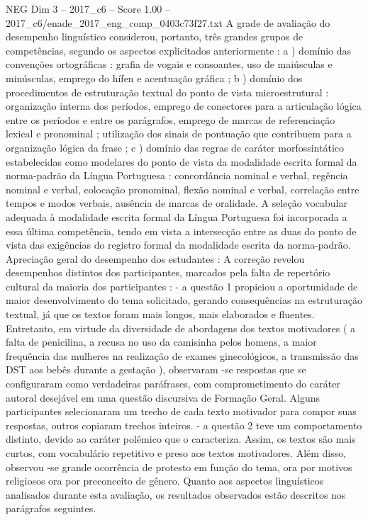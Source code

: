 \begin{textsample}{NEG Dim 3 – 2017\_c6 – Score 1.00 – 2017\_c6/enade\_2017\_eng\_comp\_0403c73f27.txt}
A grade de avaliação do desempenho linguístico considerou, portanto, três grandes grupos de competências, segundo os aspectos explicitados anteriormente : a ) domínio das convenções ortográficas : grafia de vogais e consoantes, uso de maiúsculas e minúsculas, emprego do hífen e acentuação gráfica ; b ) domínio dos procedimentos de estruturação textual do ponto de vista microestrutural : organização interna dos períodos, emprego de conectores para a articulação lógica entre os períodos e entre os parágrafos, emprego de marcas de referenciação lexical e pronominal ; utilização dos sinais de pontuação que contribuem para a organização lógica da frase ; c ) domínio das regras de caráter morfossintático estabelecidas como modelares do ponto de vista da modalidade escrita formal da norma-padrão da Língua Portuguesa : concordância nominal e verbal, regência nominal e verbal, colocação pronominal, flexão nominal e verbal, correlação entre tempos e modos verbais, ausência de marcas de oralidade.
A seleção vocabular adequada à modalidade escrita formal da Língua Portuguesa foi incorporada a essa última competência, tendo em vista a intersecção entre as duas do ponto de vista das exigências do registro formal da modalidade escrita da norma-padrão.
Apreciação geral do desempenho dos estudantes : A correção revelou desempenhos distintos dos participantes, marcados pela falta de repertório cultural da maioria dos participantes : - a questão 1 propiciou a oportunidade de maior desenvolvimento do tema solicitado, gerando consequências na estruturação textual, já que os textos foram mais longos, mais elaborados e fluentes.
Entretanto, em virtude da diversidade de abordagens dos textos motivadores ( a falta de penicilina, a recusa no uso da camisinha pelos homens, a maior frequência das mulheres na realização de exames ginecológicos, a transmissão das DST aos bebês durante a gestação ), observaram -se respostas que se configuraram como verdadeiras paráfrases, com comprometimento do caráter autoral desejável em uma questão discursiva de Formação Geral.
Alguns participantes selecionaram um trecho de cada texto motivador para compor suas respostas, outros copiaram trechos inteiros. - a questão 2 teve um comportamento distinto, devido ao caráter polêmico que o caracteriza.
Assim, os textos são mais curtos, com vocabulário repetitivo e preso aos textos motivadores.
Além disso, observou -se grande ocorrência de protesto em função do tema, ora por motivos religiosos ora por preconceito de gênero.
Quanto aos aspectos linguísticos analisados durante esta avaliação, os resultados observados estão descritos nos parágrafos seguintes.

\end{textsample}
